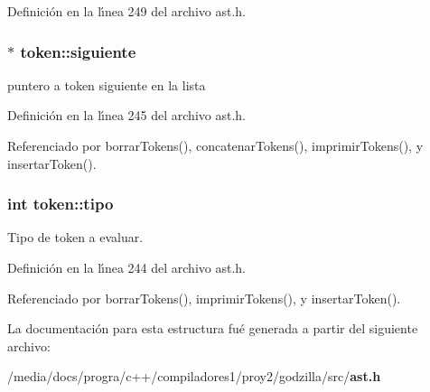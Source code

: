 Definici\'{o}n en la l\'{\i}nea 249 del archivo ast.h.
\subsubsection{$\ast$ {\bf token::siguiente}}\label{structtoken_o1}


puntero a token siguiente en la lista 



Definici\'{o}n en la l\'{\i}nea 245 del archivo ast.h.

Referenciado por borrar\-Tokens(), concatenar\-Tokens(), imprimir\-Tokens(), y insertar\-Token().
\subsubsection{\setlength{\rightskip}{0pt plus 5cm}int {\bf token::tipo}}\label{structtoken_o0}


Tipo de token a evaluar. 



Definici\'{o}n en la l\'{\i}nea 244 del archivo ast.h.

Referenciado por borrar\-Tokens(), imprimir\-Tokens(), y insertar\-Token().

La documentaci\'{o}n para esta estructura fu\'{e} generada a partir del siguiente archivo:\begin{CompactItemize}
\item 
/media/docs/progra/c++/compiladores1/proy2/godzilla/src/{\bf ast.h}\end{CompactItemize}
